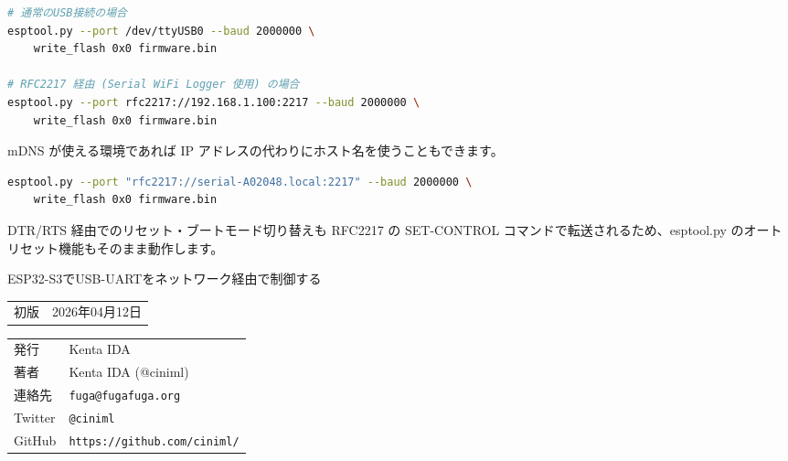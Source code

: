 \documentclass[10pt,twoside,openany,a4j]{ltjsbook}
\begin{document}
\begin{lstlisting}[language=bash]
# 通常のUSB接続の場合
esptool.py --port /dev/ttyUSB0 --baud 2000000 \
    write_flash 0x0 firmware.bin

# RFC2217 経由 (Serial WiFi Logger 使用) の場合
esptool.py --port rfc2217://192.168.1.100:2217 --baud 2000000 \
    write_flash 0x0 firmware.bin
\end{lstlisting}

mDNS が使える環境であれば IP
アドレスの代わりにホスト名を使うこともできます。

\begin{lstlisting}[language=bash]
esptool.py --port "rfc2217://serial-A02048.local:2217" --baud 2000000 \
    write_flash 0x0 firmware.bin
\end{lstlisting}

DTR/RTS 経由でのリセット・ブートモード切り替えも RFC2217 の SET-CONTROL
コマンドで転送されるため、esptool.py
のオートリセット機能もそのまま動作します。

\backmatter
\thispagestyle{empty}



\begin{center}
\textsf{ESP32-S3でUSB-UARTをネットワーク経由で制御する}

\begin{tabular}{ll}
初版 & 2026年04月12日 \\
\end{tabular}

\begin{tabular}{ll} \toprule
    発行      & Kenta IDA \\
    著者      & Kenta IDA (@ciniml) \\
    連絡先    & \verb|fuga@fugafuga.org| \\
        Twitter & \verb|@ciniml| \\
        GitHub & \verb|https://github.com/ciniml/| \\
        \bottomrule
\end{tabular}
\end{center}
\end{document}
